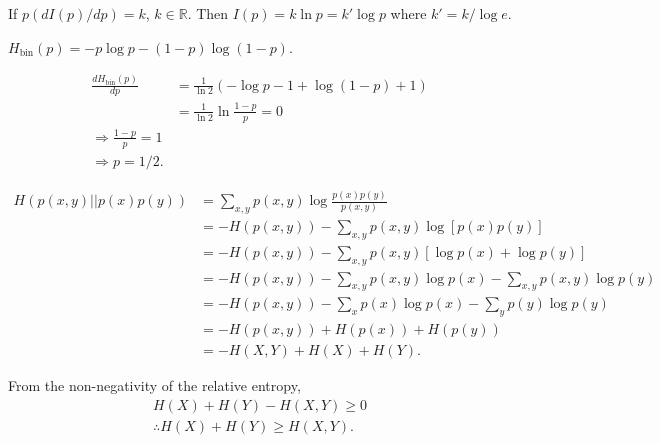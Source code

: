 If $p (d I(p) / d p) = k$, $k \in \mathds{R}$.
Then $I(p) = k \ln p = k' \log p$ where $k' = k / \log e$.



$H_{\text{bin}}(p) = - p\log p - (1-p) \log (1-p)$.

\begin{align}
    \frac{d H_{\text{bin}}(p)}{d p}
        &= \frac{1}{\ln 2} \left( - \log p - 1 + \log (1-p) + 1 \right)\\
        &= \frac{1}{\ln 2} \ln \frac{1-p}{p} = 0\\
    \Rightarrow \frac{1-p}{p} = 1\\
    \Rightarrow p = 1/2.
\end{align}



\begin{align}
    H\left( p(x,y) || p(x)p(y) \right)
        &= \sum_{x,y} p(x,y) \log \frac{p(x) p(y)}{p(x,y)}\\
        &= - H(p(x,y)) - \sum_{x,y} p(x,y) \log \left[ p(x)p(y) \right]\\
        &= - H(p(x,y)) - \sum_{x,y} p(x,y) \left[ \log p(x) + \log p(y) \right]\\
        &= - H(p(x,y)) - \sum_{x,y} p(x,y) \log p(x) - \sum_{x,y} p(x,y) \log p(y)\\
        &= - H(p(x,y)) - \sum_{x} p(x) \log p(x) - \sum_{y} p(y) \log p(y)\\
        &= - H(p(x,y)) + H(p(x)) + H(p(y))\\
        &= - H(X,Y) + H(X) + H(Y).
\end{align}

From the non-negativity of the relative entropy,
\begin{align}
    H(X) +  H(Y) - H(X,Y) \geq 0\\
    \therefore H(X) + H(Y) \geq H(X,Y).
\end{align}
